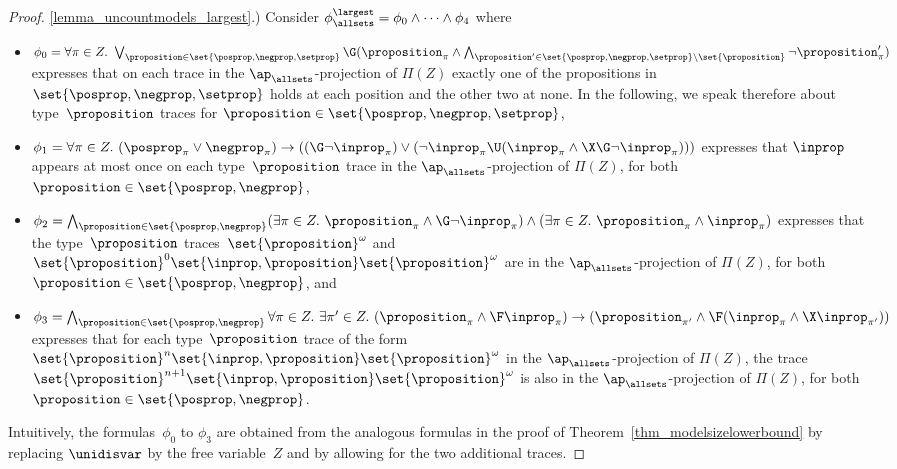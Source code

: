 \begin{proof}
\ref{lemma_uncountmodels_largest}.)
Consider $\phi_\allsets^\largest = \phi_0 \wedge \cdots \wedge \phi_4$ where
\begin{itemize}
    \item $\phi_0 = \forall \pi \in Z.\ \bigvee_{\proposition \in \set{\posprop, \negprop,\setprop}} \G (\proposition_\pi \wedge \bigwedge_{\proposition' \in \set{\posprop, \negprop,\setprop} \setminus \set{\proposition}} \neg \proposition'_\pi )$ expresses that on each trace in the $\ap_\allsets$-projection of $\Pi(Z)$ exactly one of the propositions in $\set{\posprop, \negprop,\setprop}$ holds at each position and the other two at none. 
    In the following, we speak therefore about type~$\proposition$ traces for $\proposition \in \set{\posprop, \negprop,\setprop}$,

    \item $\phi_1 = \forall \pi \in Z.\  (\posprop_\pi \vee \negprop_\pi) \rightarrow ( (\G \neg \inprop_\pi) \vee (\neg \inprop_\pi \U ( \inprop_\pi \wedge \X \G \neg \inprop_\pi )))$
    expresses that $\inprop$ appears at most once on each type~$\proposition$ trace in the $\ap_\allsets$-projection of $\Pi(Z)$, for both $\proposition \in \set{\posprop,\negprop}$,

    \item $\phi_2 = \bigwedge_{\proposition \in \set{\posprop,\negprop}} (\exists \pi \in Z.\ \proposition_\pi\wedge \G\neg \inprop_\pi) \wedge (\exists\pi \in Z.\ \proposition_\pi \wedge \inprop_\pi)$ expresses that the type~$\proposition$ traces~$\set{\proposition}^\omega$ and $\set{\proposition}^0 \set{\inprop,\proposition} \set{\proposition}^\omega$ are in the $\ap_\allsets$-projection of $\Pi(Z)$, for both $\proposition \in \set{\posprop,\negprop}$, and


    \item $\phi_3 = \bigwedge_{\proposition \in \set{\posprop,\negprop}}\forall \pi \in Z.\ \exists\pi'\in Z.\ (\proposition_\pi \wedge \F \inprop_\pi) \rightarrow ( \proposition_{\pi'} \wedge  \F (\inprop_\pi \wedge \X \inprop_{\pi'}))$ expresses that for each type~$\proposition$ trace of the form~$\set{\proposition}^n \set{\inprop,\proposition} \set{\proposition}^\omega$ in the $\ap_\allsets$-projection of $\Pi(Z)$, the trace~$\set{\proposition}^{n+1} \set{\inprop,\proposition} \set{\proposition}^\omega$ is also in the $\ap_\allsets$-projection of $\Pi(Z)$, for both $\proposition \in \set{\posprop,\negprop}$.
    
\end{itemize}
Intuitively, the formulas~$\phi_0$ to $\phi_3$ are obtained from the analogous formulas in the proof of Theorem~\ref{thm_modelsizelowerbound} by replacing $\unidisvar$ by the free variable~$Z$ and by allowing for the two additional traces.


\end{proof}
